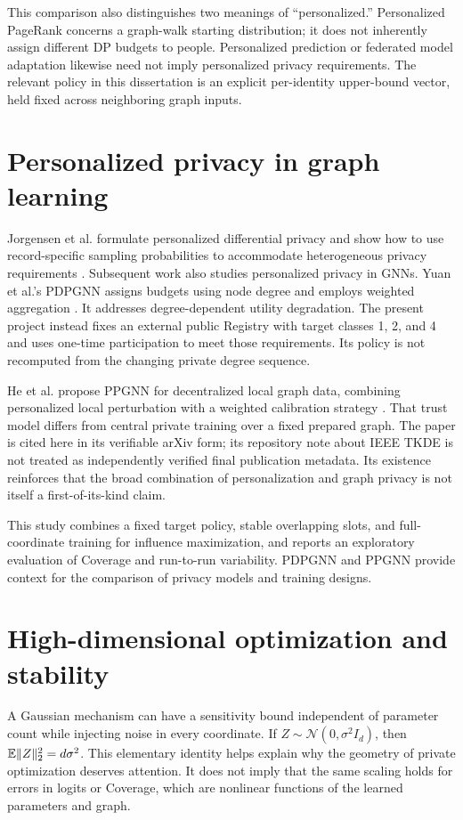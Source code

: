 This comparison also distinguishes two meanings of ``personalized.'' Personalized PageRank concerns a graph-walk starting distribution; it does not inherently assign different DP budgets to people. Personalized prediction or federated model adaptation likewise need not imply personalized privacy requirements. The relevant policy in this dissertation is an explicit per-identity upper-bound vector, held fixed across neighboring graph inputs.

\section{Personalized privacy in graph learning}
Jorgensen et al. formulate personalized differential privacy and show how to use record-specific sampling probabilities to accommodate heterogeneous privacy requirements \cite{jorgensen2015}. Subsequent work also studies personalized privacy in GNNs. Yuan et al.'s PDPGNN assigns budgets using node degree and employs weighted aggregation \cite{yuan2026}. It addresses degree-dependent utility degradation. The present project instead fixes an external public Registry with target classes 1, 2, and 4 and uses one-time participation to meet those requirements. Its policy is not recomputed from the changing private degree sequence.

He et al. propose PPGNN for decentralized local graph data, combining personalized local perturbation with a weighted calibration strategy \cite{he2026}. That trust model differs from central private training over a fixed prepared graph. The paper is cited here in its verifiable arXiv form; its repository note about IEEE TKDE is not treated as independently verified final publication metadata. Its existence reinforces that the broad combination of personalization and graph privacy is not itself a first-of-its-kind claim.

This study combines a fixed target policy, stable overlapping slots, and full-coordinate training for influence maximization, and reports an exploratory evaluation of Coverage and run-to-run variability. PDPGNN and PPGNN provide context for the comparison of privacy models and training designs.

\section{High-dimensional optimization and stability}
A Gaussian mechanism can have a sensitivity bound independent of parameter count while injecting noise in every coordinate. If $Z\sim\mathcal{N}(0,\sigma^2 I_d)$, then $\mathbb{E}\|Z\|_2^2=d\sigma^2$. This elementary identity helps explain why the geometry of private optimization deserves attention. It does not imply that the same scaling holds for errors in logits or Coverage, which are nonlinear functions of the learned parameters and graph.

